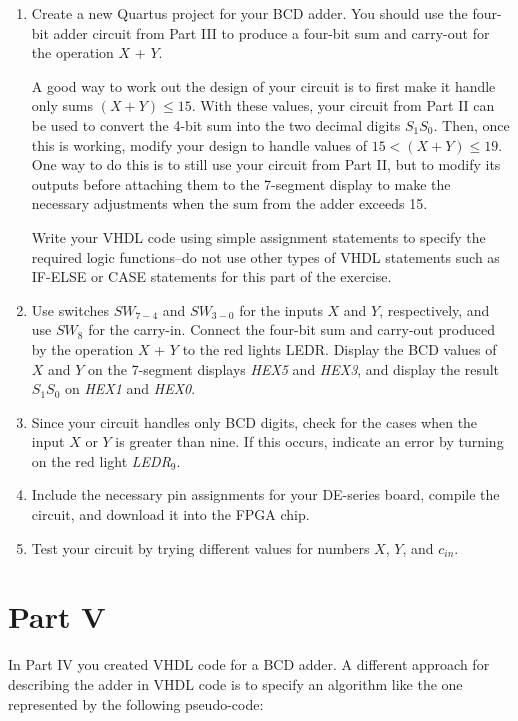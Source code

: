 \documentclass[epsfig,10pt,fullpage]{article}
\begin{document}
\begin{enumerate}
\item Create a new Quartus project for your BCD adder. You should use the
four-bit adder circuit from Part III to produce a four-bit sum and carry-out for the
operation $X$ + $Y$. 

A good way to work out the design of your circuit is to first make it handle only sums
$(X + Y) \le 15$. With these values, your circuit from Part II can be used to convert the
4-bit sum into the two decimal digits $S_1 S_0$.  Then, once this is working, modify 
your design to handle values of $15 < (X + Y) \le 19$. One way to do this is to still use 
your circuit from Part II, but to modify its outputs before attaching them to the 7-segment 
display to make the necessary adjustments when the sum from the adder exceeds 15.

Write your VHDL code using
simple assignment statements to specify the required logic functions--do not use 
other types of VHDL
statements such as IF-ELSE or CASE statements for this part of the exercise.
\item Use switches $SW_{7-4}$ and $SW_{3-0}$ for the inputs $X$ and $Y$, respectively, and
use $SW_{8}$ for the carry-in. Connect the four-bit sum and carry-out produced 
by the operation $X$ + $Y$ to the red lights LEDR. Display the BCD values of $X$
and $Y$ on the 7-segment displays {\it HEX5} and {\it HEX3}, and display the result $S_1 S_0$ on
{\it HEX1} and {\it HEX0}.
\item Since your circuit handles only BCD digits, check for the cases when the input 
$X$ or $Y$ is greater than nine. If this occurs, indicate an error by turning on 
the red light {\it LEDR}$_9$.
\item Include the necessary pin assignments for your DE-series board, compile the circuit, and
download it into the FPGA chip.
\item Test your circuit by trying different values for numbers $X$, $Y$, and $c_{in}$.
\end{enumerate}

\section*{Part V}
In Part IV you created VHDL code for a BCD adder. A different approach for describing
the adder in VHDL code is to specify an algorithm like the one
represented by the following pseudo-code:
\end{document}
